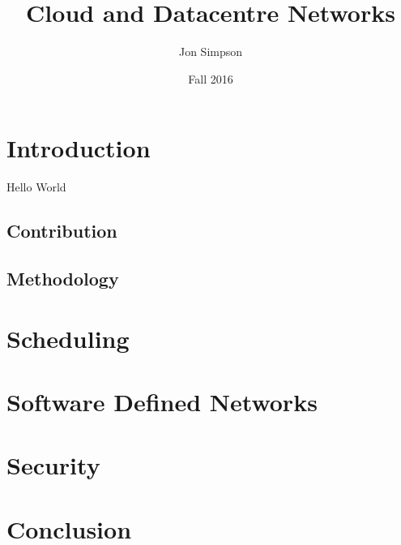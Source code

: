 \documentclass[fullapage,12pt]{article}
\title{Cloud and Datacentre Networks}
\author{Jon Simpson}
\date{Fall 2016}
\begin{document}
\begin{titlepage}
\maketitle
\end{titlepage}

\section{Introduction}
Hello World

\subsection{Contribution}

\subsection{Methodology}


\section{Scheduling}

\section{Software Defined Networks}

\section{Security}

\section{Conclusion}
\end{document}
